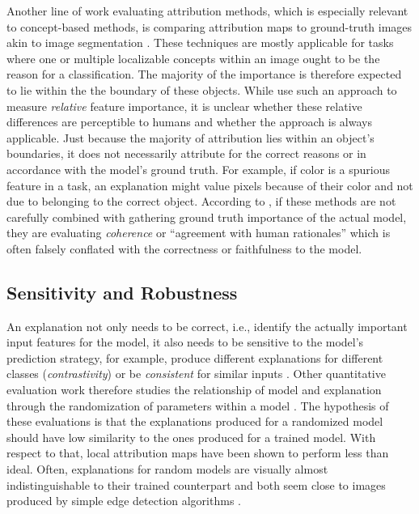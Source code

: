 Another line of work evaluating attribution methods, which is especially relevant to concept-based methods, is comparing attribution maps to ground-truth images akin to image segmentation \citep{Kim2018,Yang2019,Bau2020,Arras2022,Clark2023}. These techniques are mostly applicable for tasks where one or multiple localizable concepts within an image ought to be the reason for a classification. The majority of the importance is therefore expected to lie within the the boundary of these objects. While \cite{Yang2019} use such an approach to measure \textit{relative} feature importance, it is unclear whether these relative differences are perceptible to humans and whether the approach is always applicable. Just because the majority of attribution lies within an object's boundaries, it does not necessarily attribute for the correct reasons or in accordance with the model's ground truth. For example, if color is a spurious feature in a task, an explanation might value pixels because of their color and not due to belonging to the correct object. According to \cite{Nauta2023}, if these methods are not carefully combined with gathering ground truth importance of the actual model, they are evaluating \textit{coherence} or ``agreement with human rationales'' which is often falsely conflated with the correctness or faithfulness to the model. 

\subsection{Sensitivity and Robustness}
An explanation not only needs to be correct, i.e., identify the actually important input features for the model, it also needs to be sensitive to the model's prediction strategy, for example, produce different explanations for different classes (\textit{contrastivity}) or be \textit{consistent} for similar inputs \citep{Nauta2023}.
Other quantitative evaluation work therefore studies the relationship of model and explanation through the randomization of parameters within a model \citep{Adebayo2018, Sixt2020}. The hypothesis of these evaluations is that the explanations produced for a randomized model should have low similarity to the ones produced for a trained model. With respect to that, local attribution maps have been shown to perform less than ideal. Often, explanations for random models are visually almost indistinguishable to their trained counterpart and both seem close to images produced by simple edge detection algorithms \citep{Adebayo2018, Clark2023}.

